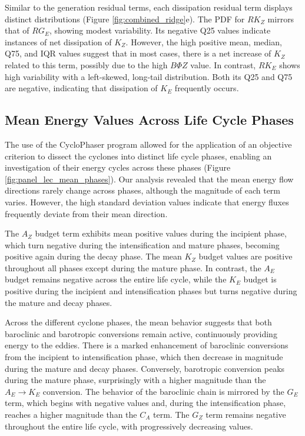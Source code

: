 \documentclass[pdflatex,sn-chicago]{sn-jnl}%
\theoremstyle{plain}
\theoremstyle{definition}
\theoremstyle{remark}
\theoremstyle{definition}
\begin{document}
Similar to the generation residual terms, each dissipation residual term displays distinct distributions (Figure \ref{fig:combined_ridge}e). The PDF for $RK_Z$ mirrors that of $RG_E$, showing modest variability. Its negative Q25 values indicate instances of net dissipation of $K_Z$. However, the high positive mean, median, Q75, and IQR values suggest that in most cases, there is a net increase of $K_Z$ related to this term, possibly due to the high $B\Phi Z$ value. In contrast, $RK_E$ shows high variability with a left-skewed, long-tail distribution. Both its Q25 and Q75 are negative, indicating that dissipation of $K_E$ frequently occurs.

\subsection{Mean Energy Values Across Life Cycle Phases}\label{sec:mean}

The use of the CycloPhaser program allowed for the application of an objective criterion to dissect the cyclones into distinct life cycle phases, enabling an investigation of their energy cycles across these phases (Figure \ref{fig:panel_lec_mean_phases}). Our analysis revealed that the mean energy flow directions rarely change across phases, although the magnitude of each term varies. However, the high standard deviation values indicate that energy fluxes frequently deviate from their mean direction.

The $A_Z$ budget term exhibits mean positive values during the incipient phase, which turn negative during the intensification and mature phases, becoming positive again during the decay phase. The mean $K_Z$ budget values are positive throughout all phases except during the mature phase. In contrast, the $A_E$ budget remains negative across the entire life cycle, while the $K_E$ budget is positive during the incipient and intensification phases but turns negative during the mature and decay phases.

Across the different cyclone phases, the mean behavior suggests that both baroclinic and barotropic conversions remain active, continuously providing energy to the eddies. There is a marked enhancement of baroclinic conversions from the incipient to intensification phase, which then decrease in magnitude during the mature and decay phases. Conversely, barotropic conversion peaks during the mature phase, surprisingly with a higher magnitude than the $A_E \rightarrow K_E$ conversion. The behavior of the baroclinic chain is mirrored by the $G_E$ term, which begins with negative values and, during the intensification phase, reaches a higher magnitude than the $C_A$ term. The $G_Z$ term remains negative throughout the entire life cycle, with progressively decreasing values.
\end{document}
